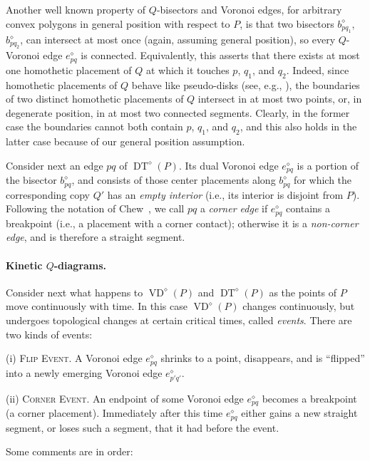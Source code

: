 \documentclass[letter,11pt]{article}
\def\poly{\diamond}
\def\DT{\mathop{\mathrm{DT}}}
\def\VD{\mathop{\mathrm{VD}}}
\begin{document}
Another well known property of $Q$-bisectors and Voronoi edges, for arbitrary convex polygons in general position with respect to $P$, is that
two bisectors $b^\poly_{pq_1}$, $b^\poly_{pq_2}$, can intersect at
most once (again, assuming general position), so every $Q$-Voronoi edge $e_{pq}^\poly$ is connected. Equivalently, this
asserts that there exists at most one homothetic placement of $Q$ at
which it touches $p$, $q_1$, and $q_2$. Indeed, since homothetic
placements of $Q$ behave like pseudo-disks (see, e.g., \cite{KLPS}),
the boundaries of two distinct homothetic placements of $Q$ intersect
in at most two points, or, in degenerate position, in at most two
connected segments. Clearly, in the former case the boundaries 
cannot both contain $p$, $q_1$, and $q_2$, and this also holds in the
latter case because of our general position assumption.


Consider next an edge $pq$ of $\DT^\poly(P)$. Its dual Voronoi edge
$e_{pq}^\poly$ is a portion of the bisector $b_{pq}^\poly$, and consists of those
center placements along $b_{pq}^\poly$ for which the corresponding copy $Q'$
has an {\em empty interior} (i.e., its interior is disjoint from $P$).
Following the notation of Chew~\cite{Chew}, we call $pq$ a
{\em corner edge} if $e_{pq}^\poly$ contains a breakpoint
(i.e., a placement with a corner contact); otherwise it is a
{\em non-corner edge}, and is therefore a straight segment.

\paragraph{Kinetic $Q$-diagrams.}
Consider next what happens to $\VD^\poly(P)$ and $\DT^\poly(P)$
as the points of $P$ move continuously with time.
In this case $\VD^\poly(P)$ changes
continuously, but undergoes topological
changes at certain critical times, called \emph{events}. There are 
two kinds of events:

\smallskip
\noindent (i) \textsc{Flip Event.}
A Voronoi edge $e_{pq}^\poly$ shrinks to a point, disappears, and is
``flipped'' into a newly emerging Voronoi edge $e_{p'q'}^\poly$.

\smallskip
\noindent (ii) \textsc{Corner Event.}
An endpoint of some Voronoi edge $e_{pq}^\poly$ becomes a breakpoint (a
corner placement). Immediately after this time $e_{pq}^\poly$ either 
gains a new straight segment, or loses such a segment, that it had before the event.

\smallskip
Some comments are in order: 
\end{document}
